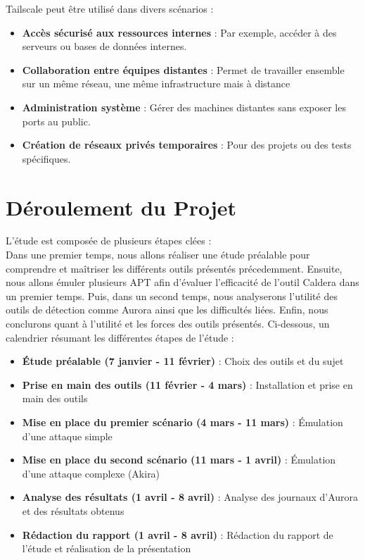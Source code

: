 \documentclass[12pt,letterpaper]{article}
\begin{document}
Tailscale peut être utilisé dans divers scénarios :
\begin{itemize}
    \item \textbf{Accès sécurisé aux ressources internes} : Par exemple, accéder à des serveurs ou bases de données internes.
    \item \textbf{Collaboration entre équipes distantes} : Permet de travailler ensemble sur un même réseau, une même infrastructure mais à distance
    \item \textbf{Administration système} : Gérer des machines distantes sans exposer les ports au public.
    \item \textbf{Création de réseaux privés temporaires} : Pour des projets ou des tests spécifiques.
\end{itemize}

\newpage
\section{Déroulement du Projet}

L'étude est composée de plusieurs étapes clées : \\
Dans une premier temps, nous allons réaliser une étude préalable pour comprendre et maîtriser les différents outils présentés précedemment.
Ensuite, nous allons émuler plusieurs APT afin d'évaluer l'efficacité de l'outil Caldera dans un premier temps.
Puis, dans un second temps, nous analyserons l'utilité des outils de détection comme Aurora ainsi que les difficultés liées.
Enfin, nous conclurons quant à l'utilité et les forces des outils présentés.
Ci-dessous, un calendrier résumant les différentes étapes de l'étude :
\begin{itemize}
    \item \textbf{Étude préalable (7 janvier - 11 février)} : Choix des outils et du sujet
    \item \textbf{Prise en main des outils (11 février - 4 mars)} : Installation et prise en main des outils
    \item \textbf{Mise en place du premier scénario (4 mars - 11 mars)} : Émulation d'une attaque simple
    \item \textbf{Mise en place du second scénario (11 mars - 1 avril)} : Émulation d'une attaque complexe (Akira)
    \item \textbf{Analyse des résultats (1 avril - 8 avril)} : Analyse des journaux d'Aurora et des résultats obtenus
    \item \textbf{Rédaction du rapport (1 avril - 8 avril)} : Rédaction du rapport de l'étude et réalisation de la présentation
\end{itemize}
\end{document}

